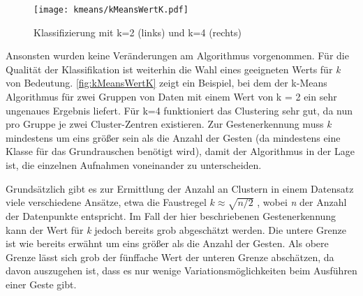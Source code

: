 \begin{figure*}[htbp]
    \centering
   \texttt{[image: kmeans/kMeansWertK.pdf]}
\caption{Klassifizierung mit k=2 (links) und k=4 (rechts)}
\label{fig:kMeansWertK}
\end{figure*}

Ansonsten wurden keine Veränderungen am Algorithmus vorgenommen.
Für die Qualität der Klassifikation ist weiterhin die Wahl eines geeigneten Werts für \emph{k} von Bedeutung. \autoref{fig:kMeansWertK} zeigt ein Beispiel, bei dem der k-Means Algorithmus für zwei Gruppen von Daten mit einem Wert von k = 2 ein sehr ungenaues Ergebnis liefert. Für k=4 funktioniert das Clustering sehr gut, da 
nun pro Gruppe je zwei Cluster-Zentren existieren.
Zur Gestenerkennung muss \emph{k} mindestens um eins größer sein als die Anzahl der Gesten (da mindestens eine Klasse für das Grundrauschen benötigt wird),
damit der Algorithmus in der Lage ist, die einzelnen Aufnahmen voneinander zu unterscheiden.  


Grundsätzlich gibt es zur Ermittlung der Anzahl an Clustern in einem Datensatz viele verschiedene Ansätze, etwa die Faustregel $k \approx \sqrt{n/2}$ \cite{WikipediaKMeansKValue}, wobei \emph{n} der Anzahl der Datenpunkte entspricht. Im Fall der hier beschriebenen Gestenerkennung kann der Wert für \emph{k} jedoch bereits grob abgeschätzt werden. 
Die untere Grenze ist wie bereits erwähnt um eins größer als die Anzahl der Gesten.
Als obere Grenze lässt sich grob der fünffache Wert der unteren Grenze abschätzen, da davon auszugehen ist, dass es nur wenige Variationsmöglichkeiten beim Ausführen einer Geste gibt.


